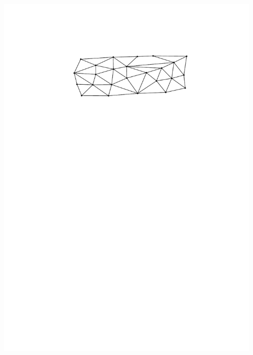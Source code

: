 \documentclass{beamer}
\begin{document}
\begin{frame}
\begin{center}
    \includegraphics[page=8,scale=0.8]{figs/proper_good}
  \end{center}
\end{frame}
\end{document}
